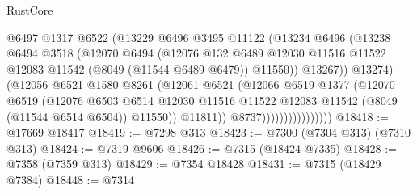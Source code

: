 \begin{lexlean}{RustCore}
\begin{coremodule}
                                  @6497
                                  @1317
                                  @6522
                                  (@13229
                                    @6496
                                    @3495
                                    @11122
                                    (@13234
                                      @6496
                                      (@13238
                                        @6494
                                        @3518
                                        (@12070
                                          @6494
                                          (@12076
                                            @132
                                            @6489
                                            @12030
                                            @11516
                                            @11522
                                            @12083
                                            @11542
                                            (@8049 (@11544 @6489 @6479))
                                            @11550))
                                        @13267))
                                    @13274)
                                  (@12056
                                    @6521
                                    @1580
                                    @8261
                                    (@12061
                                      @6521
                                      (@12066
                                        @6519
                                        @1377
                                        (@12070
                                          @6519
                                          (@12076
                                            @6503
                                            @6514
                                            @12030
                                            @11516
                                            @11522
                                            @12083
                                            @11542
                                            (@8049 (@11544 @6514 @6504))
                                            @11550))
                                        @11811))
                                    @8737))))))))))))))))
@18418 := @17669 @18417
@18419 := @7298 @313
@18423 := @7300 (@7304 @313) (@7310 @313)
@18424 := @7319 @9606
@18426 := @7315 (@18424 @7335)
@18428 := @7358 (@7359 @313)
@18429 := @7354 @18428
@18431 := @7315 (@18429 @7384)
@18448 := @7314

\end{coremodule}
\end{lexlean}
